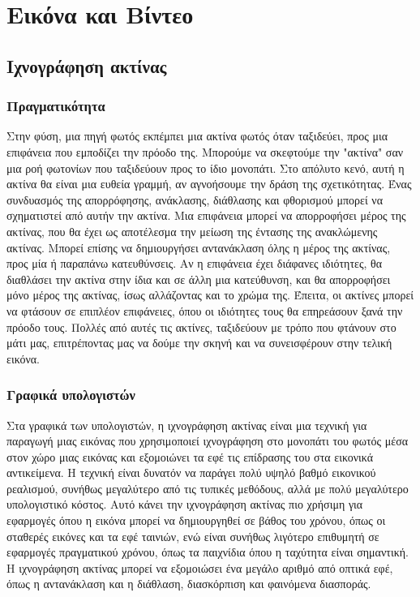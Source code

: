 \section{Εικόνα και Βίντεο}

\subsection{Ιχνογράφηση ακτίνας}
\subsubsection{Πραγματικότητα}
Στην φύση, μια πηγή φωτός εκπέμπει μια ακτίνα φωτός όταν ταξιδεύει, προς μια επιφάνεια που εμποδίζει την πρόοδο της. Μπορούμε να σκεφτούμε την "ακτίνα" σαν μια ροή φωτονίων που ταξιδεύουν προς το ίδιο μονοπάτι. Στο απόλυτο κενό, αυτή η ακτίνα θα είναι μια ευθεία γραμμή, αν αγνοήσουμε την δράση της σχετικότητας. Ένας συνδυασμός της απορρόφησης, ανάκλασης, διάθλασης και φθορισμού μπορεί να σχηματιστεί από αυτήν την ακτίνα. Μια επιφάνεια μπορεί να απορροφήσει μέρος της ακτίνας, που θα έχει ως αποτέλεσμα την μείωση της έντασης της ανακλώμενης ακτίνας. Μπορεί επίσης να δημιουργήσει αντανάκλαση όλης η μέρος της ακτίνας, προς μία ή παραπάνω κατευθύνσεις. Αν η επιφάνεια έχει διάφανες ιδιότητες, θα διαθλάσει την ακτίνα στην ίδια και σε άλλη μια κατεύθυνση, και θα απορροφήσει μόνο μέρος της ακτίνας, ίσως αλλάζοντας και το χρώμα της. Έπειτα, οι ακτίνες μπορεί να φτάσουν σε επιπλέον επιφάνειες, όπου οι ιδιότητες τους θα επηρεάσουν ξανά την πρόοδο τους. Πολλές από αυτές τις ακτίνες, ταξιδεύουν με τρόπο που φτάνουν στο μάτι μας, επιτρέποντας μας να δούμε την σκηνή και να συνεισφέρουν στην τελική εικόνα. 


\subsubsection{Γραφικά υπολογιστών}
Στα γραφικά των υπολογιστών, η ιχνογράφηση ακτίνας είναι μια τεχνική για παραγωγή μιας εικόνας που χρησιμοποιεί ιχνογράφηση στο μονοπάτι του φωτός μέσα στον χώρο μιας εικόνας και εξομοιώνει τα εφέ τις επίδρασης του στα εικονικά αντικείμενα. Η τεχνική είναι δυνατόν να παράγει πολύ υψηλό βαθμό εικονικού ρεαλισμού, συνήθως μεγαλύτερο από τις τυπικές μεθόδους, αλλά με πολύ μεγαλύτερο υπολογιστικό κόστος. Αυτό κάνει την ιχνογράφηση ακτίνας πιο χρήσιμη για εφαρμογές όπου η εικόνα μπορεί να δημιουργηθεί σε βάθος του χρόνου, όπως οι σταθερές εικόνες και τα εφέ ταινιών, ενώ είναι συνήθως λιγότερο επιθυμητή σε εφαρμογές πραγματικού χρόνου, όπως τα παιχνίδια όπου η ταχύτητα είναι σημαντική. Η ιχνογράφηση ακτίνας μπορεί να εξομοιώσει ένα μεγάλο αριθμό από οπτικά εφέ, όπως η αντανάκλαση και η διάθλαση, διασκόρπιση και φαινόμενα διασποράς.

